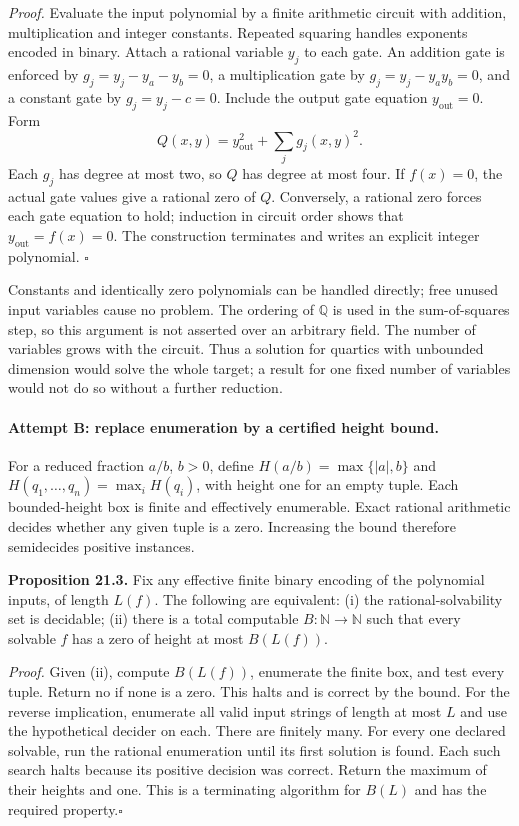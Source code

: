 \documentclass[11pt]{article}
\begin{document}
\emph{Proof.} Evaluate the input polynomial by a finite arithmetic circuit
with addition, multiplication and integer constants. Repeated squaring
handles exponents encoded in binary. Attach a rational variable $y_j$ to
each gate. An addition gate is enforced by
$g_j=y_j-y_a-y_b=0$, a multiplication gate by
$g_j=y_j-y_ay_b=0$, and a constant gate by $g_j=y_j-c=0$.
Include the output gate equation $y_{\mathrm{out}}=0$. Form
\begin{equation}\label{cont21:quartic}
 Q(x,y)=y_{\mathrm{out}}^2+\sum_j g_j(x,y)^2.
\end{equation}
Each $g_j$ has degree at most two, so $Q$ has degree at most four.
If $f(x)=0$, the actual gate values give a rational zero of $Q$.
Conversely, a rational zero forces each gate equation to hold; induction
in circuit order shows that $y_{\mathrm{out}}=f(x)=0$.
The construction terminates and writes an explicit integer polynomial.
\hfill$\square$

Constants and identically zero polynomials can be handled directly; free
unused input variables cause no problem. The ordering of $\mathbb Q$ is
used in the sum-of-squares step, so this argument is not asserted over
an arbitrary field. The number of variables grows with the circuit.
Thus a solution for quartics with unbounded dimension would solve the
whole target; a result for one fixed number of variables would not do so
without a further reduction.

\paragraph{Attempt B: replace enumeration by a certified height bound.}
For a reduced fraction $a/b$, $b>0$, define
$H(a/b)=\max\{|a|,b\}$ and
$H(q_1,\ldots,q_n)=\max_iH(q_i)$, with height one for an empty tuple.
Each bounded-height box is finite and effectively enumerable. Exact
rational arithmetic decides whether any given tuple is a zero.
Increasing the bound therefore semidecides positive instances.

\textbf{Proposition 21.3.} Fix any effective finite binary encoding of the
polynomial inputs, of length $L(f)$. The following are equivalent:
(i) the rational-solvability set is decidable;
(ii) there is a total computable $B:\mathbb N\to\mathbb N$ such that
every solvable $f$ has a zero of height at most $B(L(f))$.

\emph{Proof.} Given (ii), compute $B(L(f))$, enumerate the finite box,
and test every tuple. Return no if none is a zero. This halts and is
correct by the bound. For the reverse implication, enumerate all valid
input strings of length at most $L$ and use the hypothetical decider on
each. There are finitely many. For every one declared solvable, run the
rational enumeration until its first solution is found. Each such search
halts because its positive decision was correct. Return the maximum of
their heights and one. This is a terminating algorithm for $B(L)$ and
has the required property.\hfill$\square$
\end{document}
